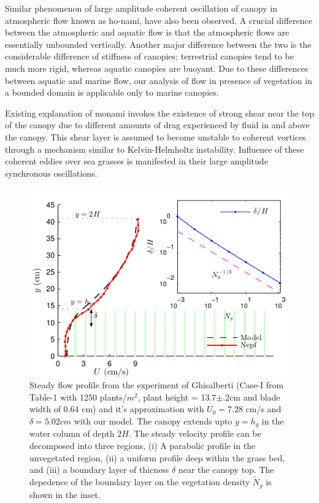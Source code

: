 \documentclass[aps,prl,reprint,twocolumn,showpacs,superscriptaddress,10pt]{revtex4-1}  %
\newcommand{\Ndg}{\tilde{N}_g}
\begin{document}
Similar phenomenon of large amplitude coherent oscillation of canopy in atmospheric flow known as ho-nami\cite{Inoue56,Raupach96}, have also been observed.
A crucial difference between the atmospheric and aquatic flow is that the atmospheric flows are essentially unbounded vertically\cite{Vivoni98,Nepf00}. 
Another major difference between the two is the considerable difference of stiffness of canopies; terrestrial canopies tend to be much more rigid, whereas aquatic canopies are buoyant\cite{Vivoni98,Ghisal02}.
Due to these differences between aquatic and marine flow, our analysis of flow in presence of vegetation in a bounded domain is applicable only to marine canopies. 

Existing explanation of monami invokes the existence of strong shear near the top of the canopy \cite{Ghisal02,Raupach96} due to different amounts of drag experienced by fluid in and above the canopy. 
This shear layer is assumed to become unstable to coherent vortices through a mechanism similar to Kelvin-Helmholtz instability. 
Influence of these coherent eddies over sea grasses is manifested in their large amplitude synchronous oscillations.

\begin{figure}
\includegraphics[scale=1]{Grass_Base_Nepf_shear}
\caption{Steady flow profile from the experiment of Ghisalberti\cite{Nepf04} (Case-I from Table-1 with 1250 plants/$m^2$, 
plant height = 13.7$\pm .2$cm and blade width of 0.64 cm)
 and it's approximation with $U_0=7.28$ cm/s and $\delta = 5.02cm$ with our model. The canopy extends upto $y=h_g$ in the water column of depth $2H$. 
The steady velocity profile can be decomposed into three regions, (i) A parabolic profile in the unvegetated region, (ii) a uniform profile deep within the grass bed, and (iii) a boundary layer of thicness $\delta$ near the canopy top. 
The depedence of the boundary layer on the vegetation density $\Ndg$ is shown in the inset.}
\label{basicflow}
\end{figure}
\end{document}
